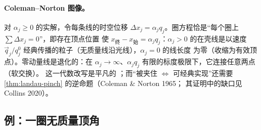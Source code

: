 \paragraph{Coleman--Norton 图像。}
对 $\alpha_j\ge0$ 的实解，令每条线的时空位移 $\Delta x_j=\alpha_jq_j$。圈方程恰是“每个圈上 $\sum\Delta x_j=0$”，即存在顶点位置
使 $x_{\text{终}}-x_{\text{始}}=\alpha_jq_j$：$\alpha_j>0$ 的在壳线是以速度 $\vec q_j/q_j^0$ 经典传播的粒子（无质量线沿光线），$\alpha_j=0$ 的线长度
为零（收缩为有效顶点）。零动量线是退化的：在 $\alpha_j\to\infty$、$\alpha_jq_j$ 有限的标度极限下，它连接任意两点（软交换）。
这一代数改写是平凡的 \tagR；而“被夹住 $\Leftrightarrow$ 可经典实现”还需要 \cref{thm:landau-pinch} 的逆命题（Coleman \& Norton 1965；
其证明中的缺口见 Collins 2020）。

\subsection{例：一圈无质量顶角}

